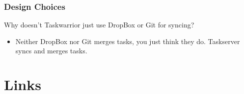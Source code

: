 \documentclass[t,handout]{beamer}
\begin{document}

\begin{frame}[fragile]\frametitle{Design Choices}
    \vfill

    Why doesn't Taskwarrior just use DropBox or Git for syncing?
    \begin{itemize}
        \item Neither DropBox nor Git merges tasks, you just think they do. Taskserver syncs and merges tasks.
    \end{itemize}
\end{frame}

\section{Links}
\end{document}
